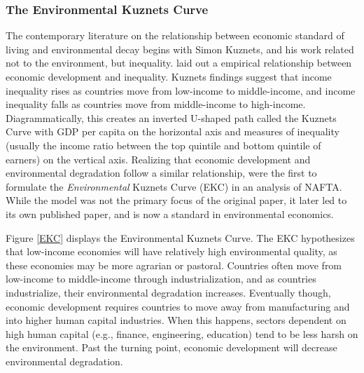 \subsubsection*{The Environmental Kuznets Curve}

The contemporary literature on the relationship between economic standard of living and environmental decay begins with Simon Kuznets, and his work related not to the environment, but inequality. \cite{kuznets1955economic} laid out a empirical relationship between economic development and inequality. Kuznets findings suggest that income inequality rises as countries move from low-income to middle-income, and income inequality falls as countries move from middle-income to high-income. Diagrammatically, this creates an inverted U-shaped path called the Kuznets Curve with GDP per capita on the horizontal axis and measures of inequality (usually the income ratio between the top quintile and bottom quintile of earners) on the vertical axis. Realizing that economic development and environmental degradation follow a similar relationship, \cite{NBERw3914} were the first to formulate the \emph{Environmental} Kuznets Curve (EKC) in an analysis of NAFTA. While the model was not the primary focus of the original paper, it later led to its own published paper, \cite{grossman1995economic} and is now a standard in environmental economics. 

Figure \ref{EKC} displays the Environmental Kuznets Curve. The EKC hypothesizes that low-income economies will have relatively high environmental quality, as these economies may be more agrarian or pastoral. Countries often move from low-income to middle-income through industrialization, and as countries industrialize, their environmental degradation increases. Eventually though, economic development requires countries to move away from manufacturing and into higher human capital industries. When this happens, sectors dependent on high human capital (e.g., finance, engineering, education) tend to be less harsh on the environment. Past the turning point, economic development will decrease environmental degradation. 

